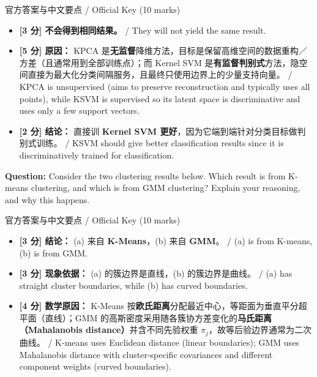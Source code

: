 \begin{StudySolution}{官方答案与中文要点 / Official Key (10 marks)}
\begin{itemize}
\item \textbf{[3 分] 不会得到相同结果。} / They will not yield the same result.
\item \textbf{[5 分] 原因：} KPCA 是\textbf{无监督}降维方法，目标是保留高维空间的数据重构／方差（且通常用到全部训练点）；而 Kernel SVM 是\textbf{有监督判别式}方法，隐空间直接为最大化分类间隔服务，且最终只使用边界上的少量支持向量。 / KPCA is unsupervised (aims to preserve reconstruction and typically uses all points), while KSVM is supervised so its latent space is discriminative and uses only a few support vectors.
\item \textbf{[2 分] 结论：} 直接训 \textbf{Kernel SVM 更好}，因为它端到端针对分类目标做判别式训练。 / KSVM should give better classification results since it is discriminatively trained for classification.
\end{itemize}
\end{StudySolution}

\textbf{Question:} Consider the two clustering results below. Which result is from K-means clustering, and which is from GMM clustering? Explain your reasoning, and why this happens.


\begin{StudySolution}{官方答案与中文要点 / Official Key (10 marks)}
\begin{itemize}
\item \textbf{[3 分] 结论：} (a) 来自 \textbf{K-Means}，(b) 来自 \textbf{GMM}。 / (a) is from K-means, (b) is from GMM.
\item \textbf{[3 分] 现象依据：} (a) 的簇边界是直线，(b) 的簇边界是曲线。 / (a) has straight cluster boundaries, while (b) has curved boundaries.
\item \textbf{[4 分] 数学原因：} K-Means 按\textbf{欧氏距离}分配最近中心，等距面为垂直平分超平面（直线）；GMM 的高斯密度采用随各簇协方差变化的\textbf{马氏距离（Mahalanobis distance）}并含不同先验权重 $\pi_j$，故等后验边界通常为二次曲线。 / K-means uses Euclidean distance (linear boundaries); GMM uses Mahalanobis distance with cluster-specific covariances and different component weights (curved boundaries).
\end{itemize}
\end{StudySolution}


